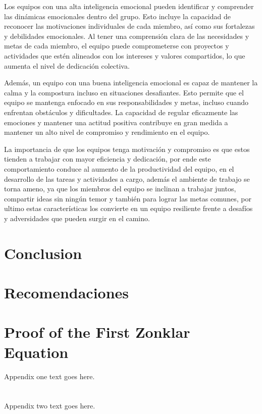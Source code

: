 \documentclass[journal]{IEEEtran}
\begin{document}
Los equipos con una alta inteligencia emocional pueden identificar y comprender las dinámicas emocionales dentro del grupo. Esto incluye la capacidad de reconocer las motivaciones individuales de cada miembro, así como sus fortalezas y debilidades emocionales. Al tener una comprensión clara de las necesidades y metas de cada miembro, el equipo puede comprometerse con proyectos y actividades que estén alineados con los intereses y valores compartidos, lo que aumenta el nivel de dedicación colectiva.

Además, un equipo con una buena inteligencia emocional es capaz de mantener la calma y la compostura incluso en situaciones desafiantes. Esto permite que el equipo se mantenga enfocado en sus responsabilidades y metas, incluso cuando enfrentan obstáculos y dificultades. La capacidad de regular eficazmente las emociones y mantener una actitud positiva contribuye en gran medida a mantener un alto nivel de compromiso y rendimiento en el equipo.

La importancia de que los equipos tenga motivación y compromiso es que estos tienden a trabajar con mayor eficiencia y dedicación, por ende este comportamiento conduce al aumento de la productividad del equipo, en el desarrollo de las tareas y actividades a cargo, además el ambiente de trabajo se torna ameno, ya que los miembros del equipo se inclinan a trabajar juntos, compartir ideas sin ningún temor y también para lograr las metas comunes, por ultimo estas características los convierte en un equipo resiliente frente a desafíos y adversidades que pueden surgir en el camino.


\section{Conclusion}

\section{Recomendaciones}

\appendices
\section{Proof of the First Zonklar Equation}
Appendix one text goes here.

\section{}
Appendix two text goes here.
\end{document}
